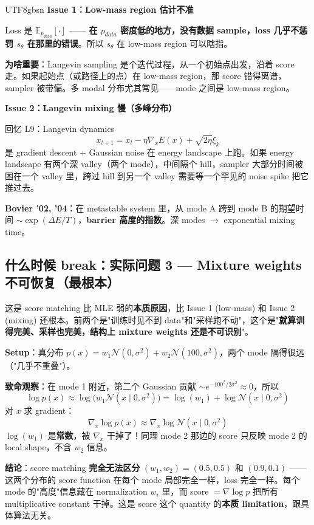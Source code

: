 \documentclass[11pt]{article}
\begin{document}
\begin{CJK}{UTF8}{gbsn}
\textbf{Issue 1：Low-mass region 估计不准}

Loss 是 $\mathbb{E}_{p_{data}}[\cdot]$ —— \textbf{在 $p_{data}$ 密度低的地方，没有数据 sample，loss 几乎不惩罚 $s_\theta$ 在那里的错误}。所以 $s_\theta$ 在 low-mass region 可以瞎指。

\textbf{为啥重要}：Langevin sampling 是个迭代过程，从一个初始点出发，沿着 score 走。如果起始点（或路径上的点）在 low-mass region，那 score 错得离谱，sampler 被带偏。多 modal 分布尤其常见——mode 之间是 low-mass region。

\textbf{Issue 2：Langevin mixing 慢（多峰分布）}

回忆 L9：Langevin dynamics
\[
x_{t+1} = x_t - \eta \nabla_x E(x) + \sqrt{2\eta} \xi_k
\]
是 gradient descent + Gaussian noise 在 energy landscape 上跑。如果 energy landscape 有两个深 valley（两个 mode），中间隔个 hill，sampler 大部分时间被困在一个 valley 里，跨过 hill 到另一个 valley 需要等一个罕见的 noise spike 把它推过去。

\textbf{Bovier '02, '04}：在 metastable system 里，从 mode A 跨到 mode B 的期望时间 $\sim \exp(\Delta E / T)$，\textbf{barrier 高度的指数}。深 modes $\to$ exponential mixing time。

\subsection{什么时候 break：实际问题 3 --- Mixture weights 不可恢复（最根本）}

这是 score matching 比 MLE 弱的\textbf{本质原因}，比 Issue 1 (low-mass) 和 Issue 2 (mixing) 还根本。前两个是"训练时见不到 data"和"采样跑不动"，这个是"\textbf{就算训得完美、采样也完美，结构上 mixture weights 还是不可识别}"。

\textbf{Setup}：真分布 $p(x) = w_1 \mathcal{N}(0, \sigma^2) + w_2 \mathcal{N}(100, \sigma^2)$，两个 mode 隔得很远（"几乎不重叠"）。

\textbf{致命观察}：在 mode 1 附近，第二个 Gaussian 贡献 $\sim e^{-100^2/2\sigma^2} \approx 0$，所以
\[
\log p(x) \approx \log\!\big(w_1 \mathcal{N}(x \mid 0, \sigma^2)\big) = \log(w_1) + \log \mathcal{N}(x \mid 0, \sigma^2)
\]
对 $x$ 求 gradient：
\[
\nabla_x \log p(x) \approx \nabla_x \log \mathcal{N}(x \mid 0, \sigma^2)
\]
$\log(w_1)$ 是\textbf{常数}，被 $\nabla_x$ 干掉了！同理 mode 2 那边的 score 只反映 mode 2 的 local shape，不含 $w_2$ 信息。

\textbf{结论}：score matching \textbf{完全无法区分} $(w_1, w_2) = (0.5, 0.5)$ 和 $(0.9, 0.1)$ —— 这两个分布的 score function 在每个 mode 局部完全一样，loss 完全一样。每个 mode 的"高度"信息藏在 normalization $w_i$ 里，而 score $= \nabla \log p$ 把所有 multiplicative constant 干掉。这是 score 这个 quantity 的\textbf{本质 limitation}，跟具体算法无关。


\end{CJK}
\end{document}
